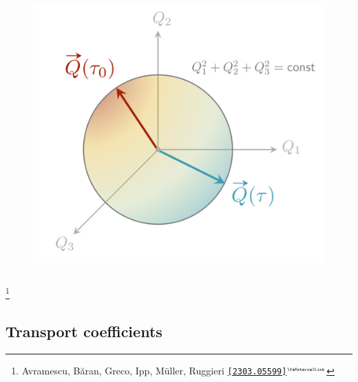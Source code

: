 \documentclass[aspectratio=169,11pt,usenames,dvipsnames]{beamer}
\renewcommand{\thefootnote}{\color{customblue}\faPaperPlaneO}
\newcommand\blfootnote[1]{%
  \begingroup
  \renewcommand\thefootnote{}\footnote{#1}%
  \addtocounter{footnote}{-1}%
  \endgroup
}
\begin{document}
\begin{frame}
\begin{columns}[onlytextwidth,t]
\begin{figure}[!hbt]
                \includegraphics[width=1.05\columnwidth]{images/wong_charge.png}
            \end{figure}
    \end{columns}

    \blfootnote{\scriptsize Avramescu, Băran, Greco, Ipp, Müller, Ruggieri  \href{https://arxiv.org/abs/2303.05599}{{\color{palgold}\texttt{[2303.05599]}$^\text{\tiny\faExternalLink}$}}}
\end{frame}


\subsection{Transport coefficients}

\end{document}
